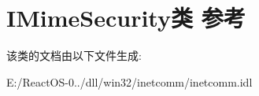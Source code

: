 \hypertarget{class_i_mime_security}{}\section{I\+Mime\+Security类 参考}
\label{class_i_mime_security}


该类的文档由以下文件生成\+:\begin{DoxyCompactItemize}
\item 
E\+:/\+React\+O\+S-\/0../dll/win32/inetcomm/inetcomm.\+idl\end{DoxyCompactItemize}
